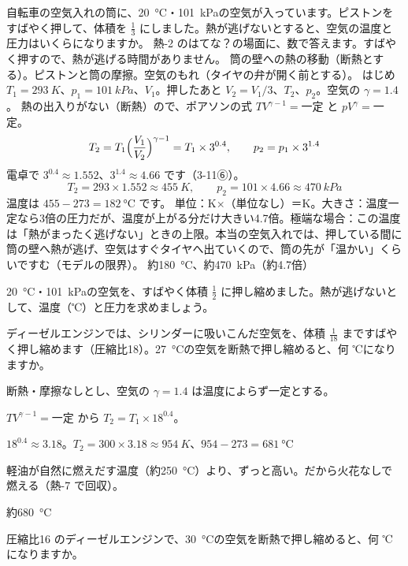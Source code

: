 \begin{phreidai}[空気入れの筒の先の温度]
\label{ph:熱-3:ex6}自転車の空気入れの筒に、\qty{20}{\celsius}・\qty{101}{kPa}の空気が入っています。ピストンをすばやく押して、体積を $\tfrac{1}{3}$ にしました。熱が逃げないとすると、空気の温度と圧力はいくらになりますか。
\phbamen
熱-2 のはてな？の場面に、数で答えます。すばやく押すので、熱が逃げる時間がありません。
\phmushi
筒の壁への熱の移動（断熱とする）。ピストンと筒の摩擦。空気のもれ（タイヤの弁が開く前とする）。
\phzu
はじめ $T_1=\qty{293}{K}$、$p_1=\qty{101}{kPa}$、$V_1$。押したあと $V_2=V_1/3$、$T_2$、$p_2$。空気の $\gamma=1.4$。
\phriyu
熱の出入りがない（断熱）ので、ポアソンの式 $TV^{\gamma-1}=$一定 と $pV^\gamma=$一定。
\phtateru
\[ T_2=T_1\Bigl(\frac{V_1}{V_2}\Bigr)^{\gamma-1}=T_1\times3^{0.4},\qquad p_2=p_1\times3^{1.4} \]
\phtoku
電卓で $3^{0.4}\approx1.552$、$3^{1.4}\approx4.66$ です（3-11⑥）。
\[ T_2=293\times1.552\approx\qty{455}{K},\qquad p_2=101\times4.66\approx\qty{470}{kPa} \]
温度は $455-273=\qty{182}{\celsius}$ です。
\phtashikame
単位：K×（単位なし）＝K。大きさ：温度一定なら3倍の圧力だが、温度が上がる分だけ大きい4.7倍。極端な場合：この温度は「熱がまったく逃げない」ときの上限。本当の空気入れでは、押している間に筒の壁へ熱が逃げ、空気はすぐタイヤへ出ていくので、筒の先が「温かい」くらいですむ（モデルの限界）。
\kotae 約\qty{180}{\celsius}、約\qty{470}{kPa}（約4.7倍）
\end{phreidai}
\begin{jibun}
\qty{20}{\celsius}・\qty{101}{kPa}の空気を、すばやく体積 $\tfrac{1}{2}$ に押し縮めました。熱が逃げないとして、温度（℃）と圧力を求めましょう。
\end{jibun}

\begin{reidai}[ディーゼルエンジンの圧縮]
\label{ph:熱-3:ex7}ディーゼルエンジンでは、シリンダーに吸いこんだ空気を、体積 $\tfrac{1}{18}$ まですばやく押し縮めます（圧縮比18）。\qty{27}{\celsius}の空気を断熱で押し縮めると、何 ℃になりますか。
\par{} 断熱・摩擦なしとし、空気の $\gamma=1.4$ は温度によらず一定とする。
\par\kangaekata $TV^{\gamma-1}=$一定 から $T_2=T_1\times18^{0.4}$。
\par\shiki $18^{0.4}\approx3.18$。$T_2=300\times3.18\approx\qty{954}{K}$、$954-273=\qty{681}{\celsius}$
\par{} 軽油が自然に燃えだす温度（約\qty{250}{\celsius}）より、ずっと高い。だから火花なしで燃える（熱-7 で回収）。
\par\kotae 約\qty{680}{\celsius}
\end{reidai}
\begin{jibun}
圧縮比16 のディーゼルエンジンで、\qty{30}{\celsius}の空気を断熱で押し縮めると、何 ℃になりますか。
\end{jibun}

